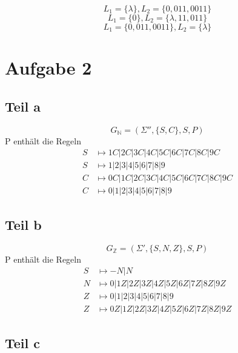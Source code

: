 \documentclass[10pt,a4paper]{article}
\begin{document}
\begin{equation}
  L_{1} = \{ \lambda \}, L_{2} = \{ 0, 011, 0011 \}
\end{equation}
\begin{equation}
  L_{1} = \{ 0 \}, L_{2} = \{ \lambda, 11, 011 \}
\end{equation}
\begin{equation}
  L_{1} = \{ 0, 011, 0011 \}, L_{2} = \{ \lambda \}
\end{equation}

\section{Aufgabe 2}

\subsection{Teil a}
\begin{equation}
  G_{\mathbb{N}} = (\Sigma'', \{ S, C \}, S, P)
\end{equation}
P enthält die Regeln
\begin{align*}
  S & \mapsto 1C | 2C | 3C | 4C | 5C | 6C | 7C | 8C | 9C\\
  S & \mapsto 1 | 2 | 3 | 4 | 5 | 6 | 7 | 8 | 9\\
  C & \mapsto 0C | 1C | 2C | 3C | 4C | 5C | 6C | 7C | 8C | 9C\\
  C & \mapsto 0 | 1 | 2 | 3 | 4 | 5 | 6 | 7 | 8 | 9
\end{align*}

\subsection{Teil b}

\begin{equation}
  G_{\mathbb{Z}} = (\Sigma', \{ S, N, Z \}, S, P)
\end{equation}
P enthält die Regeln
\begin{align*}
  S & \mapsto -N | N\\
  N & \mapsto 0 | 1Z | 2Z | 3Z | 4Z | 5Z | 6Z | 7Z | 8Z | 9Z\\
  Z & \mapsto 0 | 1 | 2 | 3 | 4 | 5 | 6 | 7 | 8 | 9\\
  Z & \mapsto 0Z | 1Z | 2Z | 3Z | 4Z | 5Z | 6Z | 7Z | 8Z | 9Z
\end{align*}

\subsection{Teil c}
\end{document}
